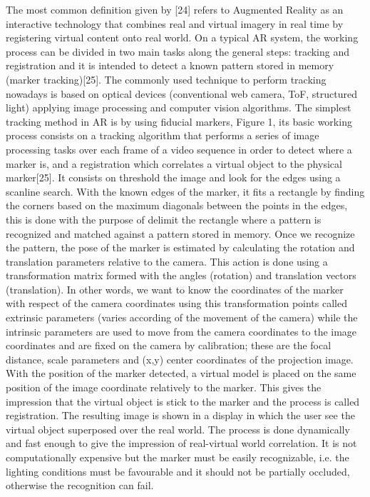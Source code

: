 The most common definition given by [24] refers to Augmented Reality as an interactive technology that combines real and virtual imagery in real time by registering virtual content onto real world. On a typical AR system, the working process can be divided in two main tasks along the general steps: tracking and registration and it is intended to detect a known pattern stored in memory (marker tracking)[25]. The commonly used technique to perform tracking nowadays is based on optical devices (conventional web camera, ToF, structured light) applying image processing and computer vision algorithms. The simplest tracking method in AR is by using fiducial markers, Figure 1, its basic working process consists on a tracking algorithm that performs a series of image processing tasks over each frame of a video sequence in order to detect where a marker is, and a registration which correlates a virtual object to the physical marker[25]. It consists on threshold the image and look for the edges using a scanline search. With the known edges of the marker, it fits a rectangle by finding the corners based on the maximum diagonals between the points in the edges, this is done with the purpose of delimit the rectangle where a pattern is recognized and matched against a pattern stored in memory. Once we recognize the pattern, the pose of the marker is estimated by calculating the rotation and translation parameters relative to the camera. This action is done using a transformation matrix formed with the angles (rotation) and translation vectors (translation). In other words, we want to know the coordinates of the marker with respect of the camera coordinates using this transformation points called extrinsic parameters (varies according of the movement of the camera) while the intrinsic parameters are used to move from the camera coordinates to the image coordinates and are fixed on the camera by calibration; these are the focal distance, scale parameters and (x,y) center coordinates of the projection image. With the position of the marker detected, a virtual model is placed on the same position of the image coordinate relatively to the marker. This gives the impression that the virtual object is stick to the marker and the process is called registration. The resulting image is shown in a display in which the user see the virtual object superposed over the real world. The process is done dynamically and fast enough to give the impression of real-virtual world correlation. It is not computationally expensive but the marker must be easily recognizable, i.e. the lighting conditions must be favourable and it should not be partially occluded, otherwise the recognition can fail.



